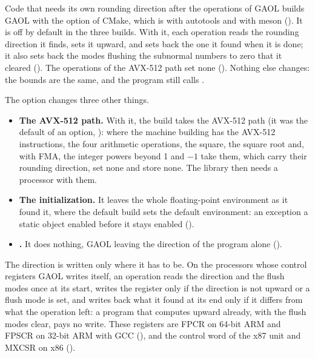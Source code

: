 \documentclass[12pt,a4paper,twoside,openright]{book}
\begin{document}
Code that needs its own rounding direction after the operations of GAOL
builds GAOL with the option  of CMake, which
is  with autotools and
 with meson
(). It is off by default in the three builds. With
it, each operation reads the rounding direction it finds, sets it upward, and
sets back the one it found when it is done; it also sets back the modes
flushing the subnormal numbers to zero that it cleared (). The
operations of the AVX-512 path set none (). Nothing else
changes: the bounds are the same, and the program still calls
.\newinvfive

\medskip
\noindent
The option changes three other things.
\begin{itemize}
\item[$\bullet$] \textbf{The AVX-512 path.} With it, the build takes the
  AVX-512 path (it was the default of an option,
  ): where the machine building has the AVX-512
  instructions, the four arithmetic operations, the square, the square root
  and, with FMA, the integer powers beyond 1 and $-1$ take them, which carry
  their rounding direction, set none and store none. The library then needs a
  processor with them.\newinvfive
\item[$\bullet$] \textbf{The initialization.} It leaves the whole
  floating-point environment as it found it, where the default build sets the
  default environment: an exception a static object enabled before it stays
  enabled ().
\item[$\bullet$] \textbf{.} It does nothing, GAOL
  leaving the direction of the program alone ().
\end{itemize}

\medskip
\noindent
The direction is written only where it has to be. On the processors whose
control registers GAOL writes itself, an operation reads the direction and the
flush modes once at its start, writes the register only if the direction is
not upward or a flush mode is set, and writes back what it found at its end
only if it differs from what the operation left: a program that computes
upward already, with the flush modes clear, pays no write. These registers
are FPCR on 64-bit ARM and FPSCR on 32-bit ARM with GCC (),
and the control word of the x87 unit and MXCSR on x86
().
\end{document}
